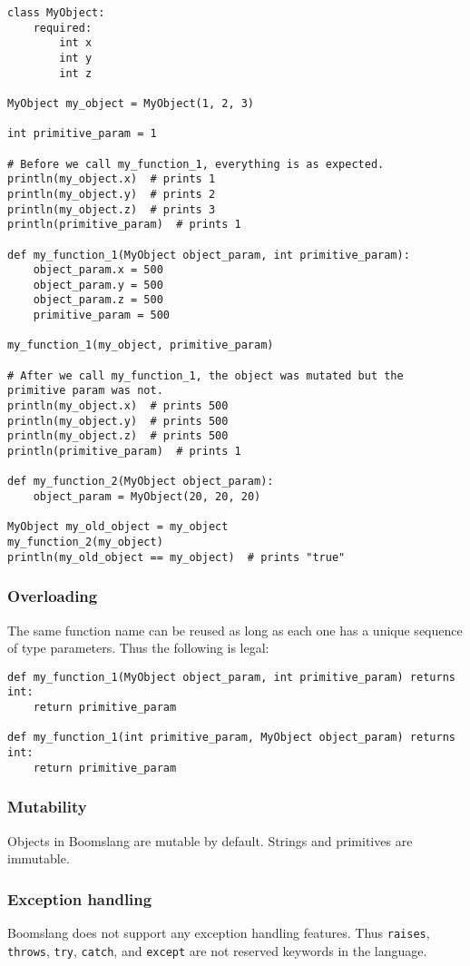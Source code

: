 \documentclass{article}
\begin{document}
\begin{verbatim}
class MyObject:
    required:
        int x
        int y
        int z

MyObject my_object = MyObject(1, 2, 3)

int primitive_param = 1

# Before we call my_function_1, everything is as expected.
println(my_object.x)  # prints 1
println(my_object.y)  # prints 2
println(my_object.z)  # prints 3
println(primitive_param)  # prints 1

def my_function_1(MyObject object_param, int primitive_param):
    object_param.x = 500
    object_param.y = 500
    object_param.z = 500
    primitive_param = 500
    
my_function_1(my_object, primitive_param)

# After we call my_function_1, the object was mutated but the primitive param was not.
println(my_object.x)  # prints 500
println(my_object.y)  # prints 500
println(my_object.z)  # prints 500
println(primitive_param)  # prints 1

def my_function_2(MyObject object_param):
    object_param = MyObject(20, 20, 20)
    
MyObject my_old_object = my_object
my_function_2(my_object)
println(my_old_object == my_object)  # prints "true"
\end{verbatim}

\subsubsection{Overloading}
The same function name can be reused as long as each one has a unique sequence of type parameters. Thus the following is legal:

\begin{verbatim}
def my_function_1(MyObject object_param, int primitive_param) returns int:
    return primitive_param
    
def my_function_1(int primitive_param, MyObject object_param) returns int:
    return primitive_param
\end{verbatim}

\subsubsection{Mutability}
Objects in Boomslang are mutable by default. Strings and primitives are immutable.

\subsubsection{Exception handling}
Boomslang does not support any exception handling features. Thus \texttt{raises}, \texttt{throws}, \texttt{try}, \texttt{catch}, and \texttt{except} are not reserved keywords in the language.
\end{document}
